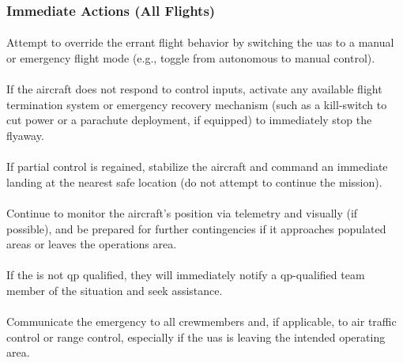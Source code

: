             \subsubsection{Immediate Actions (All Flights)}
            
                \paragraph{} Attempt to override the errant flight behavior by switching the \ac{uas} to a manual or emergency flight mode (e.g., toggle from autonomous to manual control).
                
                \paragraph{} If the aircraft does not respond to control inputs, activate any available flight termination system or emergency recovery mechanism (such as a kill-switch to cut power or a parachute deployment, if equipped) to immediately stop the flyaway.
                
                \paragraph{} If partial control is regained, stabilize the aircraft and command an immediate landing at the nearest safe location (do not attempt to continue the mission).
                
                \paragraph{} Continue to monitor the aircraft’s position via telemetry and visually (if possible), and be prepared for further contingencies if it approaches populated areas or leaves the operations area.
                
                \paragraph{} If the  is not \ac{qp} qualified, they will immediately notify a \ac{qp}-qualified team member of the situation and seek assistance.
                
                \paragraph{} Communicate the emergency to all crewmembers and, if applicable, to air traffic control or range control, especially if the \ac{uas} is leaving the intended operating area.
                
